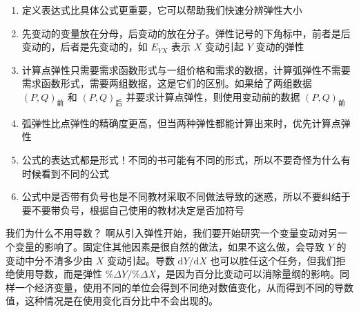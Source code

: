 \begin{enumerate}
    \item 定义表达式比具体公式更重要，它可以帮助我们快速分辨弹性大小
    \item 先变动的变量放在分母，后变动的放在分子。弹性记号的下角标中，前者是后变动的，后者是先变动的，如 $E_{YX}$ 表示 $X$ 变动引起 $Y$ 变动的弹性
    \item 计算点弹性只需要需求函数形式与一组价格和需求的数据，计算弧弹性不需要需求函数形式，需要两组数据，这是它们的区别。如果给了两组数据 $\left(P,Q\right)_{\text{前}}$ 和 $\left(P,Q\right)_{\text{后}}$ 并要求计算点弹性，则使用变动前的数据 $\left(P,Q\right)_{\text{前}}$
    \item 弧弹性比点弹性的精确度更高，但当两种弹性都能计算出来时，优先计算点弹性
    \item 公式的表达式都是形式！不同的书可能有不同的形式，所以不要奇怪为什么有时候看到不同的公式
    \item 公式中是否带有负号也是不同教材采取不同做法导致的迷惑，所以不要纠结于要不要带负号，根据自己使用的教材决定是否加符号
\end{enumerate}

\begin{ramble}{我们为什么不用导数？}
    啊从引入弹性开始，我们要开始研究一个变量变动对另一个变量的影响了。固定住其他因素是很自然的做法，如果不这么做，会导致 $Y$ 的变动中分不清多少由 $X$ 变动引起。导数 $\mathrm dY/\mathrm dX$ 也可以胜任这个任务，但我们拒绝使用导数，而是弹性 $\%\Delta Y/\%\Delta X$，是因为百分比变动可以消除量纲的影响。同样一个经济变量，使用不同的单位会得到不同绝对数值变化，从而得到不同的导数值，这种情况是在使用变化百分比中不会出现的。
\end{ramble}